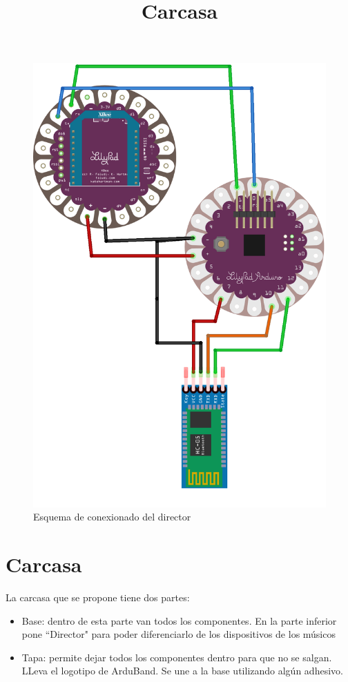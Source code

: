 \begin{figure}[!htb]
\centering
\includegraphics[width=1\textwidth]{./imagenes/director_esquema}
\caption{Esquema de conexionado del director} \label{fig:director_esquema}
\end{figure}

\clearpage

\section{Carcasa}
\title{Carcasa}

La carcasa que se propone tiene dos partes:
\begin{itemize}
  \item Base: dentro de esta parte van todos los componentes. En la parte inferior pone ``Director"
  para poder diferenciarlo de los dispositivos de los músicos
  \item Tapa: permite dejar todos los componentes dentro para que no se salgan. LLeva el logotipo
  de ArduBand. Se une a la base utilizando algún adhesivo.
\end{itemize}

